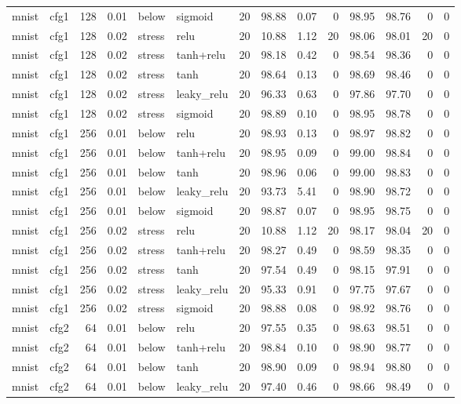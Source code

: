 \begin{table}[htbp]
{\begin{tabular}{@{}llrrllrrrrrrrr@{}}
mnist & cfg1 & 128 & 0.01 & below & sigmoid & 20 & 98.88 & 0.07 & 0 & 98.95 & 98.76 & 0 & 0 \\
mnist & cfg1 & 128 & 0.02 & stress & relu & 20 & 10.88 & 1.12 & 20 & 98.06 & 98.01 & 20 & 0 \\
mnist & cfg1 & 128 & 0.02 & stress & tanh+relu & 20 & 98.18 & 0.42 & 0 & 98.54 & 98.36 & 0 & 0 \\
mnist & cfg1 & 128 & 0.02 & stress & tanh & 20 & 98.64 & 0.13 & 0 & 98.69 & 98.46 & 0 & 0 \\
mnist & cfg1 & 128 & 0.02 & stress & leaky\_relu & 20 & 96.33 & 0.63 & 0 & 97.86 & 97.70 & 0 & 0 \\
mnist & cfg1 & 128 & 0.02 & stress & sigmoid & 20 & 98.89 & 0.10 & 0 & 98.95 & 98.78 & 0 & 0 \\
mnist & cfg1 & 256 & 0.01 & below & relu & 20 & 98.93 & 0.13 & 0 & 98.97 & 98.82 & 0 & 0 \\
mnist & cfg1 & 256 & 0.01 & below & tanh+relu & 20 & 98.95 & 0.09 & 0 & 99.00 & 98.84 & 0 & 0 \\
mnist & cfg1 & 256 & 0.01 & below & tanh & 20 & 98.96 & 0.06 & 0 & 99.00 & 98.83 & 0 & 0 \\
mnist & cfg1 & 256 & 0.01 & below & leaky\_relu & 20 & 93.73 & 5.41 & 0 & 98.90 & 98.72 & 0 & 0 \\
mnist & cfg1 & 256 & 0.01 & below & sigmoid & 20 & 98.87 & 0.07 & 0 & 98.95 & 98.75 & 0 & 0 \\
mnist & cfg1 & 256 & 0.02 & stress & relu & 20 & 10.88 & 1.12 & 20 & 98.17 & 98.04 & 20 & 0 \\
mnist & cfg1 & 256 & 0.02 & stress & tanh+relu & 20 & 98.27 & 0.49 & 0 & 98.59 & 98.35 & 0 & 0 \\
mnist & cfg1 & 256 & 0.02 & stress & tanh & 20 & 97.54 & 0.49 & 0 & 98.15 & 97.91 & 0 & 0 \\
mnist & cfg1 & 256 & 0.02 & stress & leaky\_relu & 20 & 95.33 & 0.91 & 0 & 97.75 & 97.67 & 0 & 0 \\
mnist & cfg1 & 256 & 0.02 & stress & sigmoid & 20 & 98.88 & 0.08 & 0 & 98.92 & 98.76 & 0 & 0 \\
mnist & cfg2 & 64 & 0.01 & below & relu & 20 & 97.55 & 0.35 & 0 & 98.63 & 98.51 & 0 & 0 \\
mnist & cfg2 & 64 & 0.01 & below & tanh+relu & 20 & 98.84 & 0.10 & 0 & 98.90 & 98.77 & 0 & 0 \\
mnist & cfg2 & 64 & 0.01 & below & tanh & 20 & 98.90 & 0.09 & 0 & 98.94 & 98.80 & 0 & 0 \\
mnist & cfg2 & 64 & 0.01 & below & leaky\_relu & 20 & 97.40 & 0.46 & 0 & 98.66 & 98.49 & 0 & 0 \\

\end{tabular}}
\end{table}
